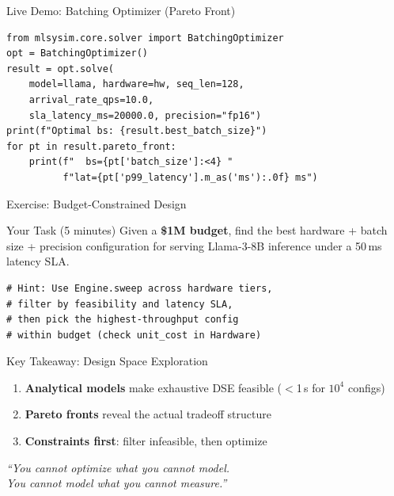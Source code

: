 \documentclass[aspectratio=169, 12pt]{beamer}
\begin{document}
\begin{frame}[fragile]{Live Demo: Batching Optimizer (Pareto Front)}
\begin{lstlisting}
from mlsysim.core.solver import BatchingOptimizer
opt = BatchingOptimizer()
result = opt.solve(
    model=llama, hardware=hw, seq_len=128,
    arrival_rate_qps=10.0,
    sla_latency_ms=20000.0, precision="fp16")
print(f"Optimal bs: {result.best_batch_size}")
for pt in result.pareto_front:
    print(f"  bs={pt['batch_size']:<4} "
          f"lat={pt['p99_latency'].m_as('ms'):.0f} ms")
\end{lstlisting}
\end{frame}

\begin{frame}[fragile]{Exercise: Budget-Constrained Design}
\begin{alertblock}{Your Task (5 minutes)}
Given a \textbf{\$1M budget}, find the best hardware + batch size + precision
configuration for serving Llama-3-8B inference under a 50\,ms latency SLA.
\end{alertblock}

\begin{lstlisting}
# Hint: Use Engine.sweep across hardware tiers,
# filter by feasibility and latency SLA,
# then pick the highest-throughput config
# within budget (check unit_cost in Hardware)
\end{lstlisting}

\end{frame}

\begin{frame}{Key Takeaway: Design Space Exploration}
\begin{center}
\Large
\begin{enumerate}
  \item \textbf{Analytical models} make exhaustive DSE feasible ($<$1\,s for $10^4$ configs)
  \item \textbf{Pareto fronts} reveal the actual tradeoff structure
  \item \textbf{Constraints first}: filter infeasible, then optimize
\end{enumerate}

\vspace{1em}
\normalsize
\textit{``You cannot optimize what you cannot model.\\
You cannot model what you cannot measure.''}
\end{center}
\end{frame}
\end{document}
